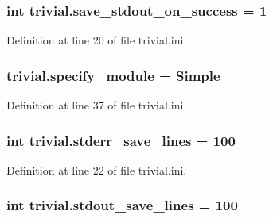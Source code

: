 \hypertarget{namespacetrivial_af272dc5ab194f706f77eeb74de7b8c97}{
\subsubsection[{save\-\_\-stdout\-\_\-on\-\_\-success}]{\setlength{\rightskip}{0pt plus 5cm}int trivial.\-save\-\_\-stdout\-\_\-on\-\_\-success = 1}}\label{namespacetrivial_af272dc5ab194f706f77eeb74de7b8c97}


Definition at line 20 of file trivial.\-ini.

\hypertarget{namespacetrivial_af5dae1522345f303cfb4527587cd5361}{
\subsubsection[{specify\-\_\-module}]{\setlength{\rightskip}{0pt plus 5cm}trivial.\-specify\-\_\-module = Simple}}\label{namespacetrivial_af5dae1522345f303cfb4527587cd5361}


Definition at line 37 of file trivial.\-ini.

\hypertarget{namespacetrivial_af6ee4456e84c354e7845aae7ea24d022}{
\subsubsection[{stderr\-\_\-save\-\_\-lines}]{\setlength{\rightskip}{0pt plus 5cm}int trivial.\-stderr\-\_\-save\-\_\-lines = 100}}\label{namespacetrivial_af6ee4456e84c354e7845aae7ea24d022}


Definition at line 22 of file trivial.\-ini.

\hypertarget{namespacetrivial_aee208868790b8c2d6d9f48ad238aa6c5}{
\subsubsection[{stdout\-\_\-save\-\_\-lines}]{\setlength{\rightskip}{0pt plus 5cm}int trivial.\-stdout\-\_\-save\-\_\-lines = 100}}\label{namespacetrivial_aee208868790b8c2d6d9f48ad238aa6c5}


